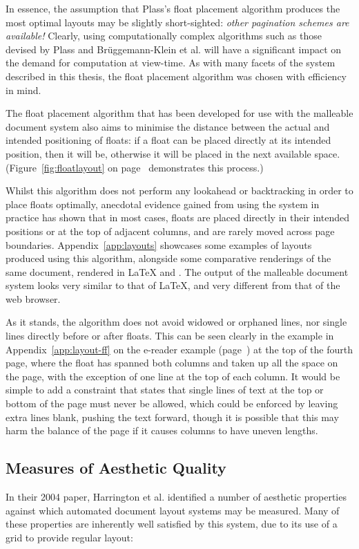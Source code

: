In essence, the assumption that Plass's float placement algorithm produces the most optimal layouts may be slightly short-sighted: \emph{other pagination schemes are available!} Clearly, using computationally complex algorithms such as those devised by Plass and Br\"uggemann-Klein et al. will have a significant impact on the demand for computation at view-time. As with many facets of the system described in this thesis, the float placement algorithm was chosen with efficiency in mind.

The float placement algorithm that has been developed for use with the malleable document system also aims to minimise the distance between the actual and intended positioning of floats: if a float can be placed directly at its intended position, then it will be, otherwise it will be placed in the next available space. (Figure~\ref{fig:floatlayout} on page~\pageref{fig:floatlayout} demonstrates this process.)

Whilst this algorithm does not perform any lookahead or backtracking in order to place floats optimally, anecdotal evidence gained from using the system in practice has shown that in most cases, floats are placed directly in their intended positions or at the top of adjacent columns, and are rarely moved across page boundaries. Appendix~\ref{app:layouts} showcases some examples of layouts produced using this algorithm, alongside some comparative renderings of the same document, rendered in \LaTeX{} and \html{}. The output of the malleable document system looks very similar to that of \LaTeX, and very different from that of the web browser.

As it stands, the algorithm does not avoid widowed or orphaned lines, nor single lines directly before or after floats. This can be seen clearly in the example in Appendix~\ref{app:layout-ff} on the e-reader example (page~\pageref{app:p:layout-ff-ereader}) at the top of the fourth page, where the float has spanned both columns and taken up all the space on the page, with the exception of one line at the top of each column. It would be simple to add a constraint that states that single lines of text at the top or bottom of the page must never be allowed, which could be enforced by leaving extra lines blank, pushing the text forward, though it is possible that this may harm the balance of the page if it causes columns to have uneven lengths.


\subsection{Measures of Aesthetic Quality}
\label{sec:aesthetic-quality}
In their 2004 paper, Harrington et al.\hspace{0pt}\cite{Harrington2004} identified a number of aesthetic properties against which automated document layout systems may be measured. Many of these properties are inherently well satisfied by this system, due to its use of a grid to provide regular layout:

